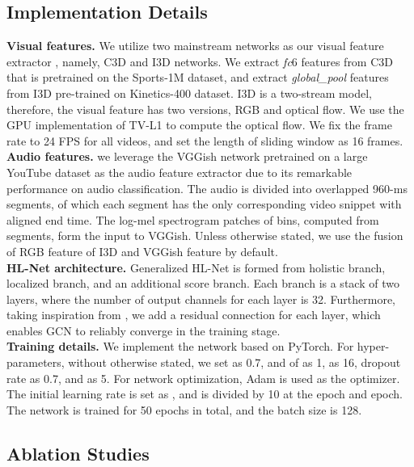 \documentclass[runningheads]{llncs}
\begin{document}
\subsection{Implementation Details}
\textbf{Visual features.} We utilize two mainstream networks as our visual feature extractor , namely, C3D \cite{tran2015learning} and I3D \cite{carreira2017quo} networks. We extract \textit{fc}6 features from C3D that is pretrained on the Sports-1M dataset, and extract \textit{global\_pool} features from I3D pre-trained on Kinetics-400 dataset. I3D is a two-stream model, therefore, the visual feature has two versions, RGB and optical flow. We use the GPU implementation of TV-L1 \cite{zach2007duality} to compute the optical flow. We fix the frame rate to 24 FPS for all videos, and set the length of sliding window as 16 frames. \\
\noindent\textbf{Audio features.} we leverage the VGGish \cite{gemmeke2017audio,hershey2017cnn} network pretrained on a large YouTube dataset as the audio feature extractor  due to its remarkable performance on audio classification. The audio is divided into overlapped 960-ms segments, of which each segment has the only corresponding video snippet with aligned end time. The log-mel spectrogram patches of  bins, computed from segments, form the input to VGGish. Unless otherwise stated, we use the fusion of RGB feature of I3D and VGGish feature by default.\\
\noindent\textbf{HL-Net architecture.} Generalized HL-Net is formed from holistic branch, localized branch, and an additional score branch. Each branch is a stack of two layers, where the number of output channels for each layer is 32. Furthermore, taking inspiration from \cite{he2016deep,shi2019two,li2019deepgcns}, we add a residual connection for each layer, which enables GCN to reliably converge in the training stage.\\
\noindent\textbf{Training details.} We implement the network based on PyTorch. For hyper-parameters, without otherwise stated, we set  as 0.7,  and  of  as 1,  as 16, dropout rate as 0.7, and  as 5. For network optimization, Adam is used as the optimizer. The initial learning rate is set as , and is divided by 10 at the  epoch and  epoch. The network is trained for 50 epochs in total, and the batch size is 128.

\subsection{Ablation Studies}
\end{document}
